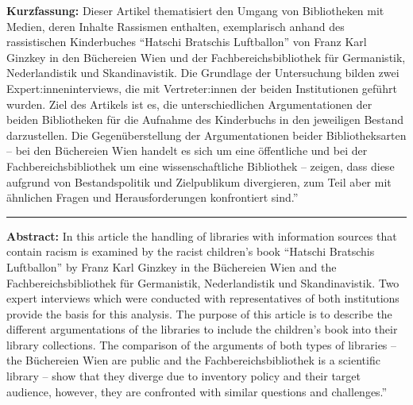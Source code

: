 \textbf{Kurzfassung:} Dieser Artikel thematisiert den Umgang von Bibliotheken mit
Medien, deren Inhalte Rassismen enthalten, exemplarisch anhand des
rassistischen Kinderbuches \enquote{Hatschi Bratschis Luftballon} von Franz
Karl Ginzkey in den Büchereien Wien und der Fachbereichsbibliothek für
Germanistik, Nederlandistik und Skandinavistik. Die Grundlage der
Untersuchung bilden zwei Expert:inneninterviews, die mit Vertreter:innen
der beiden Institutionen geführt wurden. Ziel des Artikels ist es, die
unterschiedlichen Argumentationen der beiden Bibliotheken für die
Aufnahme des Kinderbuchs in den jeweiligen Bestand darzustellen. Die
Gegenüberstellung der Argumentationen beider Bibliotheksarten -- bei den
Büchereien Wien handelt es sich um eine öffentliche und bei der
Fachbereichsbibliothek um eine wissenschaftliche Bibliothek -- zeigen,
dass diese aufgrund von Bestandspolitik und Zielpublikum divergieren,
zum Teil aber mit ähnlichen Fragen und Herausforderungen konfrontiert
sind.''

\begin{center}\rule{0.5\linewidth}{0.5pt}\end{center}

\noindent \textbf{Abstract:}  In this article the handling of libraries with information
sources that contain racism is examined by the racist children's book
\enquote{Hatschi Bratschis Luftballon} by Franz Karl Ginzkey in the Büchereien
Wien and the Fachbereichsbibliothek für Germanistik, Nederlandistik und
Skandinavistik. Two expert interviews which were conducted with
representatives of both institutions provide the basis for this
analysis. The purpose of this article is to describe the different
argumentations of the libraries to include the children's book into
their library collections. The comparison of the arguments of both types
of libraries -- the Büchereien Wien are public and the
Fachbereichsbibliothek is a scientific library -- show that they diverge
due to inventory policy and their target audience, however, they are
confronted with similar questions and challenges.''
